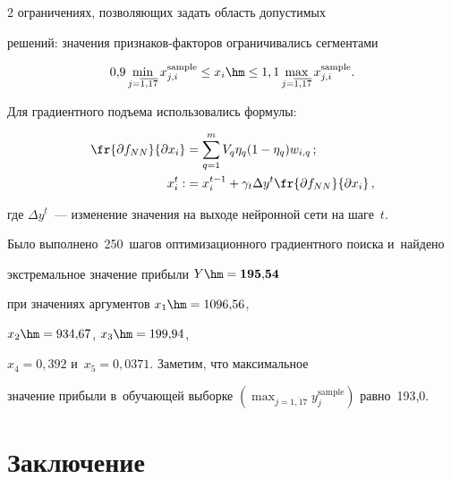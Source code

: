 \begin{multicols}{2}
  ограничениях, позволяющих задать об\-ласть до\-пус\-ти\-мых 


  решений: значения при\-зна\-ков-фак\-то\-ров ограничивались сегментами  


   $$


   0{,}9\min\limits_{j=\overline{1{,}17}} x_{j,i}^{\mathrm{sample}} \leq x_i 


   \hm\leq 1,1\max\limits_{j=\overline{1,17}} x_{j,i}^{\mathrm{sample}}.


   $$


    


   Для градиентного подъема использовались формулы:


\begin{align*}


\fr{\partial f_{NN}}{\partial x_i}&= 


\sum\limits_{q=1}^m V_q \eta_q (1-\eta_q) w_{i,q}\,; \\


 x_i^t:&=x_i^{t-1}+\gamma_t \Delta y^t \fr{\partial f_{NN}}{\partial x_i}\,,


 \end{align*}


где $\Delta y^t$~--- изменение значения на выходе нейронной сети на шаге~$t$.


Было выполнено~250~шагов  оптимизационного градиентного поиска и~найдено 


экстремальное значение прибыли $Y \hm=  {\mathbf{195{,}54}}$  


при значениях аргументов $x_1\hm= 1096{,}56$,   


$x_2\hm= 934{,}67$,   $x_3\hm= 199{,}94$,  


$x_4 =  0{,}392$ и~$x_5 = 0{,}0371$. Заметим, что максимальное 


значение прибыли в~обучающей выборке $\left(\max_{j=\overline{1{,}17}} 


y_j^{\mathrm{sample}}\right)$ равно~193,0.














\section{Заключение}






\end{multicols}
